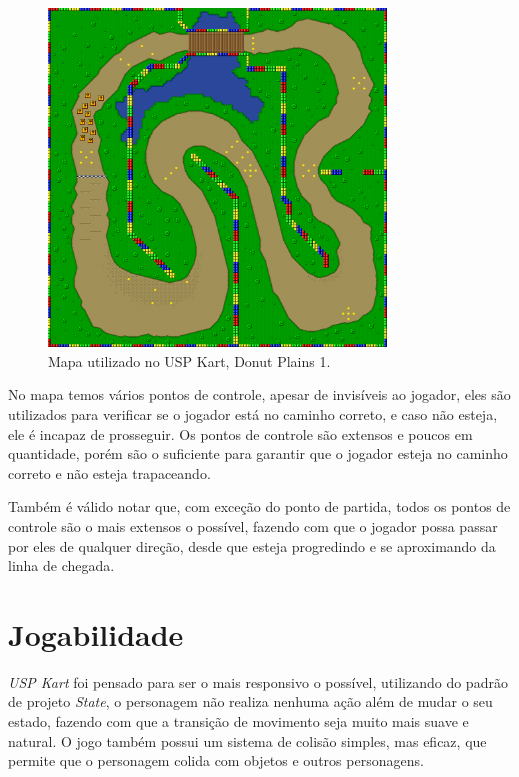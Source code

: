 \begin{figure}[H]
    \centering
    \includegraphics[width=0.8\textwidth]{figuras/Mapa.png}
    \caption{Mapa utilizado no USP Kart, Donut Plains 1. \cite{marioKart}}
    \label{fig:mapa}
\end{figure}


No mapa temos vários pontos de controle, apesar de invisíveis ao jogador, eles são utilizados para verificar se o jogador está no caminho correto, e caso não esteja, ele é incapaz de prosseguir. Os pontos de controle são extensos e poucos em quantidade, porém são o suficiente para garantir que o jogador esteja no caminho correto e não esteja trapaceando.

Também é válido notar que, com exceção do ponto de partida, todos os pontos de controle são o mais extensos o possível, fazendo com que o jogador possa passar por eles de qualquer direção, desde que esteja progredindo e se aproximando da linha de chegada.

\section{Jogabilidade}

\textit{USP Kart} foi pensado para ser o mais responsivo o possível, utilizando do padrão de projeto \textit{State}, o personagem não realiza nenhuma ação além de mudar o seu estado, fazendo com que a transição de movimento seja muito mais suave e natural. O jogo também possui um sistema de colisão simples, mas eficaz, que permite que o personagem colida com objetos e outros personagens.

